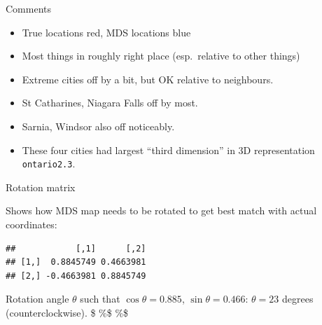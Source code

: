 \documentclass[ignorenonframetext,]{beamer}
\newenvironment{Shaded}{\begin{snugshade}}{\end{snugshade}}
\newcommand{\NormalTok}[1]{#1}
\newcommand{\OperatorTok}[1]{\textcolor[rgb]{0.81,0.36,0.00}{\textbf{#1}}}
\begin{document}
\begin{frame}[fragile]{Comments}
\protect\hypertarget{comments-21}{}

\begin{itemize}
\item
  True locations red, MDS locations blue
\item
  Most things in roughly right place (esp.~relative to other things)
\item
  Extreme cities off by a bit, but OK relative to neighbours.
\item
  St Catharines, Niagara Falls off by most.
\item
  Sarnia, Windsor also off noticeably.
\item
  These four cities had largest ``third dimension'' in 3D representation
  \texttt{ontario2.3}.
\end{itemize}

\end{frame}

\begin{frame}[fragile]{Rotation matrix}
\protect\hypertarget{rotation-matrix}{}

Shows how MDS map needs to be rotated to get best match with actual
coordinates:

\begin{Shaded}
\end{Shaded}

\begin{verbatim}
##            [,1]      [,2]
## [1,]  0.8845749 0.4663981
## [2,] -0.4663981 0.8845749
\end{verbatim}

Rotation angle \(\theta\) such that \(\cos\theta=0.885\),
\(\sin\theta=0.466\): \(\theta=23\) degrees (counterclockwise). \$ \%\$
\%\$

\end{frame}
\end{document}
